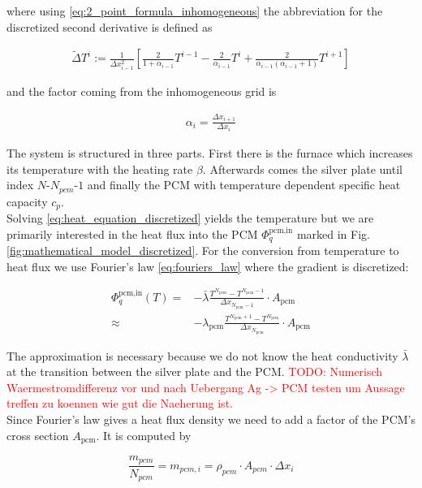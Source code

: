 \documentclass{scrartcl}[12pt, halfparskip]
\newcommand{\todo}[1]{\textcolor{red}{TODO: #1}}
\begin{document}
where using \eqref{eq:2_point_formula_inhomogeneous} the abbreviation for the discretized second derivative is defined as

\begin{align}
	\tilde{\Delta} T^i := \frac{1}{\Delta x_{i-1}^2} \left[ \frac{2}{1+\alpha_{i-1}} T^{i-1} - \frac{2}{\alpha_{i-1}} T^{i} + \frac{2}{\alpha_{i-1} (\alpha_{i-1} + 1)} T^{i+1} \right]
\end{align}

and the factor coming from the inhomogeneous grid is

\begin{align}
	\alpha_i = \frac{\Delta x_{i+1}}{\Delta x_{i}}
\end{align}

The system is structured in three parts. First there is the furnace which increases its temperature with the heating rate $\beta$. Afterwards comes the silver plate until index $N$-$N_{pcm}$-$1$ and finally the PCM with temperature dependent specific heat capacity $c_p$. \\

Solving \eqref{eq:heat_equation_discretized} yields the temperature but we are primarily interested in the heat flux into the PCM $\varPhi_{q}^{\text{pcm,in}}$ marked in Fig. \ref{fig:mathematical_model_discretized}. For the conversion from temperature to heat flux we use Fourier's law \eqref{eq:fouriers_law} where the gradient is discretized:

\begin{align}
	\varPhi_{q}^{\text{pcm,in}}(T) = & - \bar{\lambda} \frac{T^{N_{\text{pcm}}} - T^{N_{\text{pcm}}-1}}{\Delta x_{N_{\text{pcm}}-1}} \cdot A_{\text{pcm}} \\
	\approx & - \lambda_{\text{pcm}} \frac{T^{N_{\text{pcm}}+1} - T^{N_{\text{pcm}}}}{\Delta x_{N_{\text{pcm}}}} \cdot A_{\text{pcm}} \nonumber
\end{align}

The approximation is necessary because we do not know the heat conductivity $\bar{\lambda}$ at the transition between the silver plate and the PCM. \todo{Numerisch Waermestromdifferenz vor und nach Uebergang Ag -> PCM testen um Aussage treffen zu koennen wie gut die Naeherung ist.} \\
Since Fourier's law gives a heat flux density we need to add a factor of the PCM's cross section $A_{\text{pcm}}$. It is computed by

\begin{equation}
	\frac{m_{pcm}}{N_{pcm}} = m_{pcm,i} = \rho_{pcm} \cdot A_{pcm} \cdot \Delta x_i 
\end{equation}
\end{document}
